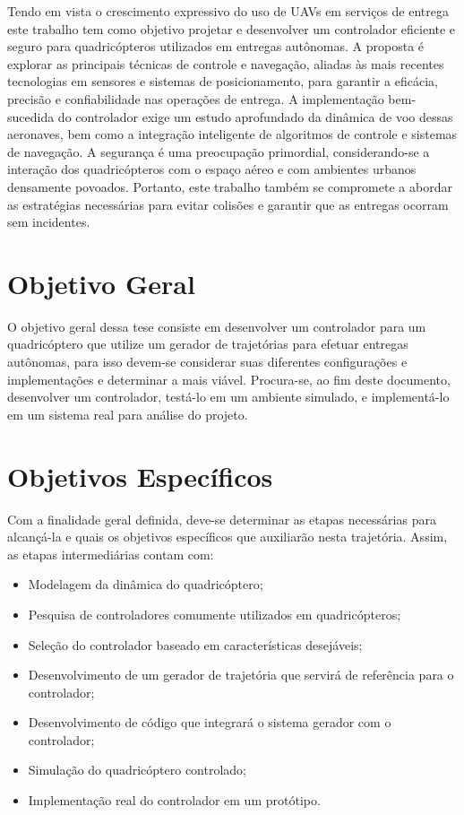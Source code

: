 \documentclass[main.tex]{subfiles}
\begin{document}
Tendo em vista o crescimento expressivo do uso de UAVs em serviços de entrega este trabalho tem como objetivo projetar e desenvolver um controlador eficiente e seguro para quadricópteros utilizados em entregas autônomas. A proposta é explorar as principais técnicas de controle e navegação, aliadas às mais recentes tecnologias em sensores e sistemas de posicionamento, para garantir a eficácia, precisão e confiabilidade nas operações de entrega. A implementação bem-sucedida do controlador exige um estudo aprofundado da dinâmica de voo dessas aeronaves, bem como a integração inteligente de algoritmos de controle e sistemas de navegação. A segurança é uma preocupação primordial, considerando-se a interação dos quadricópteros com o espaço aéreo e com ambientes urbanos densamente povoados. Portanto, este trabalho \textcolor{att}{também} se compromete a abordar as estratégias necessárias para evitar colisões e garantir que as entregas ocorram sem incidentes.

\section{Objetivo Geral}

O objetivo geral dessa tese consiste em desenvolver um controlador para um quadricóptero que utilize um gerador de trajetórias para efetuar entregas autônomas, para isso devem-se considerar suas diferentes configurações e implementações e determinar a mais viável. \textcolor{att}{Procura-se, ao fim deste documento, desenvolver um controlador, testá-lo em um ambiente simulado, e implementá-lo em um sistema real para análise do projeto.}

\section{Objetivos Específicos}

Com a finalidade geral definida, deve-se determinar as etapas necessárias para alcançá-la e quais os objetivos específicos que auxiliarão nesta trajetória. Assim, as etapas intermediárias contam com:

\begin{itemize}
    \item Modelagem da dinâmica do quadricóptero;
    \item \textcolor{att}{Pesquisa de controladores comumente utilizados em quadricópteros;}
    \item Seleção do controlador baseado em características desejáveis;
    \item \textcolor{att}{Desenvolvimento de um gerador de trajetória que servirá de referência para o controlador;}
    \item \textcolor{att}{Desenvolvimento de código que integrará o sistema gerador com o controlador;}
    \item Simulação do quadricóptero controlado;
    \item Implementação real do controlador em um protótipo.
\end{itemize}
\end{document}
